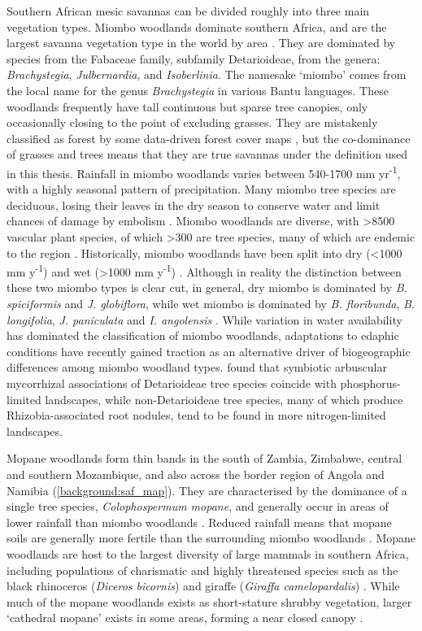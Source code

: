 \begin{refsection}
Southern African mesic savannas can be divided roughly into three main vegetation types. Miombo woodlands dominate southern Africa, and are the largest savanna vegetation type in the world by area \citep{Ryan2011}. They are dominated by species from the Fabaceae family, subfamily Detarioideae, from the genera: \textit{Brachystegia}, \textit{Julbernardia}, and \textit{Isoberlinia}. The namesake `miombo' comes from the local name for the genus \textit{Brachystegia} in various Bantu languages. These woodlands frequently have tall continuous but sparse tree canopies, only occasionally closing to the point of excluding grasses. They are mistakenly classified as forest by some data-driven forest cover maps \citep{Hansen2013}, but the co-dominance of grasses and trees means that they are true savannas under the definition used in this thesis. Rainfall in miombo woodlands varies between 540-1700 mm yr\textsuperscript{-1}, with a highly seasonal pattern of precipitation. Many miombo tree species are deciduous, losing their leaves in the dry season to conserve water and limit chances of damage by embolism \citep{Tomlinson2013}. Miombo woodlands are diverse, with >8500 vascular plant species, of which >300 are tree species, many of which are endemic to the region \citep{Frost1996}. Historically, miombo woodlands have been split into dry (<1000 mm y\textsuperscript{-1}) and wet (>1000 mm y\textsuperscript{-1}) \citep{White1983}. Although in reality the distinction between these two miombo types is clear cut, in general, dry miombo is dominated by \textit{B. spiciformis} and \textit{J. globiflora}, while wet miombo is dominated by \textit{B. floribunda}, \textit{B. longifolia}, \textit{J. paniculata} and \textit{I. angolensis} \citep{Frost1996}. While variation in water availability has dominated the classification of miombo woodlands, adaptations to edaphic conditions have recently gained traction as an alternative driver of biogeographic differences among miombo woodland types. \citet{Gomes2021} found that symbiotic arbuscular mycorrhizal associations of Detarioideae tree species coincide with phosphorus-limited landscapes, while non-Detarioideae tree species, many of which produce Rhizobia-associated root nodules, tend to be found in more nitrogen-limited landscapes.

Mopane woodlands form thin bands in the south of Zambia, Zimbabwe, central and southern Mozambique, and also across the border region of Angola and Namibia (\autoref{background:saf_map}). They are characterised by the dominance of a single tree species, \textit{Colophospermum mopane}, and generally occur in areas of lower rainfall than miombo woodlands \citep{Palgrave2003}. Reduced rainfall means that mopane soils are generally more fertile than the surrounding miombo woodlands \citep{Makhado2014}. Mopane woodlands are host to the largest diversity of large mammals in southern Africa, including populations of charismatic and highly threatened species such as the black rhinoceros (\textit{Diceros bicornis}) and giraffe (\textit{Giraffa camelopardalis}) \citep{Mittermeier2003}. While much of the mopane woodlands exists as short-stature shrubby vegetation, larger `cathedral mopane' exists in some areas, forming a near closed canopy \citep{Makhado2014}.


\end{refsection}
